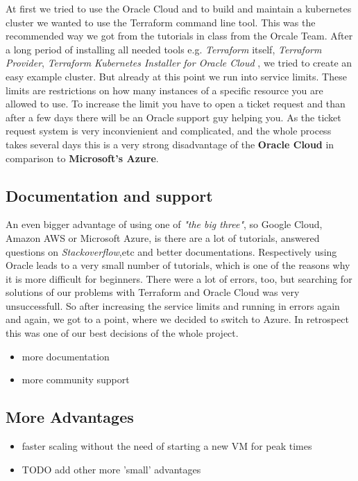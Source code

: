 \documentclass[conference]{IEEEtran}
\begin{document}
At first we tried to use the Oracle Cloud and to build and maintain a kubernetes cluster we wanted to use the Terraform command
line tool. This was the recommended way we got from the tutorials in class from the Orcale Team.
After a long period of installing all needed tools e.g. \textit{Terraform} itself, \textit{Terraform Provider},
\textit{Terraform Kubernetes Installer for Oracle Cloud} \cite{TerrafromK8sInstaller}, we tried to create an easy example cluster.
But already at this point we run into service limits. These limits are restrictions on how many instances of a specific resource you are
allowed to use. To increase the limit you have to open a ticket request and than after a few days there will be an Oracle support guy
helping you. As the ticket request system is very inconvienient and complicated, and the whole process takes several days this is a very strong
disadvantage of the \textbf{Oracle Cloud} in comparison to \textbf{Microsoft's Azure}.

\subsection{Documentation and support}
An even bigger advantage of using one of \textit{"the big three"}, so Google Cloud, Amazon AWS or Microsoft Azure, is there are
a lot of tutorials, answered questions on \textit{Stackoverflow},etc and better documentations. Respectively using Oracle leads to
a very small number of tutorials, which is one of the reasons why it is more difficult for beginners. There were a lot of errors, too,
but searching for solutions of our problems with Terraform and Oracle Cloud was very unsuccessfull.
So after increasing the service limits and running in errors again and again, we got to a point, where we decided to switch to Azure.
In retrospect this was one of our best decisions of the whole project.

\begin{itemize}
	\item more documentation
	\item more community support
\end{itemize}

\subsection{More Advantages}
\begin{itemize}
	\item faster scaling without the need of starting a new VM for peak times
	\item TODO add other more 'small' advantages
\end{itemize}
\end{document}
